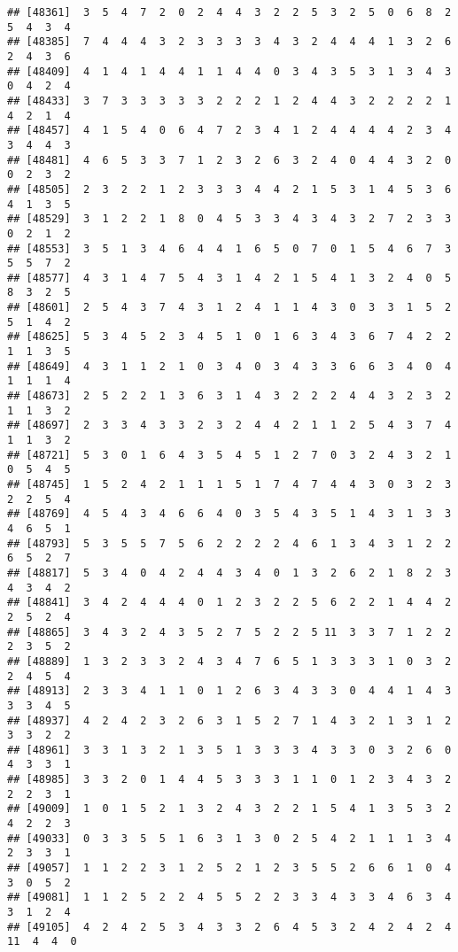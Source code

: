 \documentclass[
]{article}
\begin{document}
\begin{verbatim}
## [48361]  3  5  4  7  2  0  2  4  4  3  2  2  5  3  2  5  0  6  8  2  5  4  3  4
## [48385]  7  4  4  4  3  2  3  3  3  3  4  3  2  4  4  4  1  3  2  6  2  4  3  6
## [48409]  4  1  4  1  4  4  1  1  4  4  0  3  4  3  5  3  1  3  4  3  0  4  2  4
## [48433]  3  7  3  3  3  3  3  2  2  2  1  2  4  4  3  2  2  2  2  1  4  2  1  4
## [48457]  4  1  5  4  0  6  4  7  2  3  4  1  2  4  4  4  4  2  3  4  3  4  4  3
## [48481]  4  6  5  3  3  7  1  2  3  2  6  3  2  4  0  4  4  3  2  0  0  2  3  2
## [48505]  2  3  2  2  1  2  3  3  3  4  4  2  1  5  3  1  4  5  3  6  4  1  3  5
## [48529]  3  1  2  2  1  8  0  4  5  3  3  4  3  4  3  2  7  2  3  3  0  2  1  2
## [48553]  3  5  1  3  4  6  4  4  1  6  5  0  7  0  1  5  4  6  7  3  5  5  7  2
## [48577]  4  3  1  4  7  5  4  3  1  4  2  1  5  4  1  3  2  4  0  5  8  3  2  5
## [48601]  2  5  4  3  7  4  3  1  2  4  1  1  4  3  0  3  3  1  5  2  5  1  4  2
## [48625]  5  3  4  5  2  3  4  5  1  0  1  6  3  4  3  6  7  4  2  2  1  1  3  5
## [48649]  4  3  1  1  2  1  0  3  4  0  3  4  3  3  6  6  3  4  0  4  1  1  1  4
## [48673]  2  5  2  2  1  3  6  3  1  4  3  2  2  2  4  4  3  2  3  2  1  1  3  2
## [48697]  2  3  3  4  3  3  2  3  2  4  4  2  1  1  2  5  4  3  7  4  1  1  3  2
## [48721]  5  3  0  1  6  4  3  5  4  5  1  2  7  0  3  2  4  3  2  1  0  5  4  5
## [48745]  1  5  2  4  2  1  1  1  5  1  7  4  7  4  4  3  0  3  2  3  2  2  5  4
## [48769]  4  5  4  3  4  6  6  4  0  3  5  4  3  5  1  4  3  1  3  3  4  6  5  1
## [48793]  5  3  5  5  7  5  6  2  2  2  2  4  6  1  3  4  3  1  2  2  6  5  2  7
## [48817]  5  3  4  0  4  2  4  4  3  4  0  1  3  2  6  2  1  8  2  3  4  3  4  2
## [48841]  3  4  2  4  4  4  0  1  2  3  2  2  5  6  2  2  1  4  4  2  2  5  2  4
## [48865]  3  4  3  2  4  3  5  2  7  5  2  2  5 11  3  3  7  1  2  2  2  3  5  2
## [48889]  1  3  2  3  3  2  4  3  4  7  6  5  1  3  3  3  1  0  3  2  2  4  5  4
## [48913]  2  3  3  4  1  1  0  1  2  6  3  4  3  3  0  4  4  1  4  3  3  3  4  5
## [48937]  4  2  4  2  3  2  6  3  1  5  2  7  1  4  3  2  1  3  1  2  3  3  2  2
## [48961]  3  3  1  3  2  1  3  5  1  3  3  3  4  3  3  0  3  2  6  0  4  3  3  1
## [48985]  3  3  2  0  1  4  4  5  3  3  3  1  1  0  1  2  3  4  3  2  2  2  3  1
## [49009]  1  0  1  5  2  1  3  2  4  3  2  2  1  5  4  1  3  5  3  2  4  2  2  3
## [49033]  0  3  3  5  5  1  6  3  1  3  0  2  5  4  2  1  1  1  3  4  2  3  3  1
## [49057]  1  1  2  2  3  1  2  5  2  1  2  3  5  5  2  6  6  1  0  4  3  0  5  2
## [49081]  1  1  2  5  2  2  4  5  5  2  2  3  3  4  3  3  4  6  3  4  3  1  2  4
## [49105]  4  2  4  2  5  3  4  3  3  2  6  4  5  3  2  4  2  4  2  4 11  4  4  0

\end{verbatim}
\end{document}
